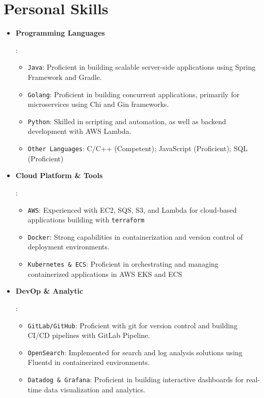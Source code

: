 \documentclass[letterpaper,11pt]{article}
\newcommand{\resumeItem}[2]{
  \item\small{
    \textbf{#1}{: #2 \vspace{-2pt}}
  }
}
\newcommand{\resumeSubItem}[2]{
  \item\small{
    \texttt{#1}{: #2 \vspace{-1pt}}
  }
}
\newcommand{\resumeItemListStart}{\begin{itemize}[leftmargin=*]}
\newcommand{\resumeItemListEnd}{\end{itemize}\vspace{-2pt}}
\newcommand{\resumeSubItemListStart}{\begin{itemize}[leftmargin=*]\vspace{-5pt}}
\newcommand{\resumeSubItemListEnd}{\end{itemize}\vspace{-5pt}}
\begin{document}
\section{Personal Skills}
    \resumeItemListStart
        \resumeItem{Programming Languages}{
          \resumeSubItemListStart
            \resumeSubItem{Java}{Proficient in building scalable server-side applications using Spring Framework and Gradle.}
            \resumeSubItem{Golang}{Proficient in building concurrent applications, primarily for microservices using Chi and Gin frameworks.}
            \resumeSubItem{Python}{Skilled in scripting and automation, as well as backend development with AWS Lambda.}
            \resumeSubItem{Other Languages}{C/C++ (Competent); JavaScript (Proficient); SQL (Proficient)}
          \resumeSubItemListEnd
        }
        \resumeItem{Cloud Platform \& Tools}{
          \resumeSubItemListStart
            \resumeSubItem{AWS}{Experienced with EC2, SQS, S3, and Lambda for cloud-based applications building with \texttt{terraform}}
            \resumeSubItem{Docker}{Strong capabilities in containerization and version control of deployment environments.}
            \resumeSubItem{Kubernetes \& ECS}{Proficient in orchestrating and managing containerized applications in AWS EKS and ECS}
          \resumeSubItemListEnd
        }
        \resumeItem{DevOp \& Analytic}{
          \resumeSubItemListStart
            \resumeSubItem{GitLab/GitHub}{Proficient with git for version control and building CI/CD pipelines with GitLab Pipeline.}
            \resumeSubItem{OpenSearch}{Implemented for search and log analysis solutions using Fluentd in containerized environments.}
            \resumeSubItem{Datadog \& Grafana}{Proficient in building interactive dashboards for real-time data visualization and analytics.}
          \resumeSubItemListEnd
        }
    \resumeItemListEnd
    
\end{document}
